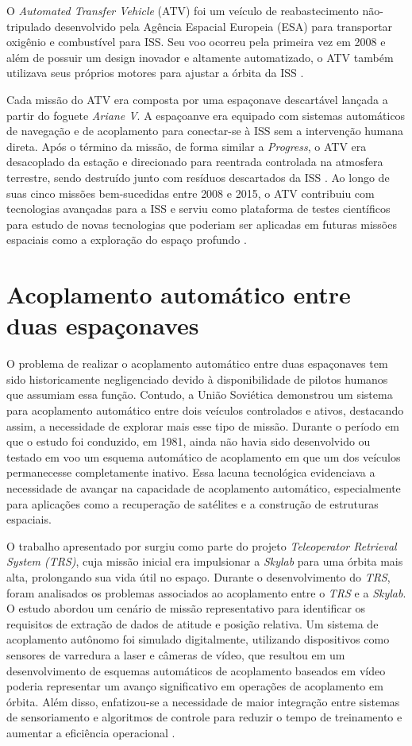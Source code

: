O \emph{Automated Transfer Vehicle} (ATV) foi um veículo de reabastecimento não-tripulado desenvolvido pela Agência Espacial Europeia (ESA) para transportar oxigênio e combustível para ISS.
Seu voo ocorreu pela primeira vez em 2008 e além de possuir um design inovador e altamente automatizado, o ATV também utilizava seus próprios motores para ajustar a órbita da ISS \cite{esaATV}.

Cada missão do ATV era composta por uma espaçonave descartável lançada a partir do foguete \emph{Ariane V}. A espaçoanve era equipado com sistemas automáticos de navegação e de acoplamento para conectar-se à ISS sem a intervenção humana direta.
Após o término da missão, de forma similar a \emph{Progress}, o ATV era desacoplado da estação e direcionado para reentrada controlada na atmosfera terrestre, sendo destruído junto com resíduos descartados da ISS \cite{esaATV}.
Ao longo de suas cinco missões bem-sucedidas entre 2008 e 2015, o ATV contribuiu com tecnologias avançadas para a ISS e serviu como plataforma de testes científicos para estudo de novas tecnologias que poderiam ser aplicadas em futuras missões espaciais como a exploração do espaço profundo \cite{esaATV}.

\section{Acoplamento automático entre duas espaçonaves}

O problema de realizar o acoplamento automático entre duas espaçonaves tem sido historicamente negligenciado devido à disponibilidade de pilotos humanos que assumiam essa função.
Contudo, a União Soviética demonstrou um sistema para acoplamento automático entre dois veículos controlados e ativos, destacando assim, a necessidade de explorar mais esse tipo de missão.
Durante o período em que o estudo foi conduzido, em 1981, ainda não havia sido desenvolvido ou testado em voo um esquema automático de acoplamento em que um dos veículos permanecesse completamente inativo.
Essa lacuna tecnológica evidenciava a necessidade de avançar na capacidade de acoplamento automático, especialmente para aplicações como a recuperação de satélites e a construção de estruturas espaciais.

O trabalho apresentado por \cite{micheal1981} surgiu como parte do projeto \emph{Teleoperator Retrieval System (TRS)}, cuja missão inicial era impulsionar a \emph{Skylab} para uma órbita mais alta, prolongando sua vida útil no espaço. Durante o desenvolvimento do \emph{TRS}, foram analisados os problemas associados ao acoplamento entre o \emph{TRS} e a \emph{Skylab}. 
O estudo abordou um cenário de missão representativo para identificar os requisitos de extração de dados de atitude e posição relativa. Um sistema de acoplamento autônomo foi simulado digitalmente, utilizando dispositivos como sensores de varredura a laser e câmeras de vídeo, que resultou em um desenvolvimento de esquemas automáticos de acoplamento baseados em vídeo poderia representar um avanço significativo em operações de acoplamento em órbita.
Além disso, enfatizou-se a necessidade de maior integração entre sistemas de sensoriamento e algoritmos de controle para reduzir o tempo de treinamento e aumentar a eficiência operacional \cite{micheal1981}.

